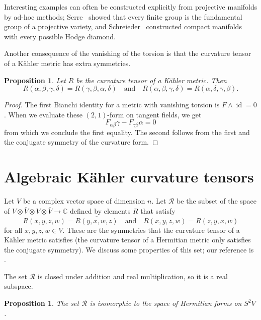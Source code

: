 \documentclass[11pt]{article}
\newtheorem{prop}[theo]{Proposition}
\newtheorem*{proof}{Proof}
\newcommand{\kk}[1]{\mathbb{#1}}
\newcommand{\cc}[1]{\mathcal{#1}}
\DeclareMathOperator{\id}{id}
\begin{document}
Interesting examples can often be constructed explicitly from projective manifolds by ad-hoc methods; Serre~\cite{serre1958topologie} showed that every finite group is the fundamental group of a projective variety, and Schreieder~\cite{schreieder2015construction} constructed compact manifolds with every possible Hodge diamond.


Another consequence of the vanishing of the torsion is that the curvature tensor of a K\"ahler metric has extra symmetries.

\begin{prop}
Let $R$ be the curvature tensor of a K\"ahler metric. Then
$$
R(\alpha,\beta,\gamma,\delta) = R(\gamma,\beta,\alpha,\delta)
\quad\text{and}\quad
R(\alpha,\beta,\gamma,\delta) = R(\alpha,\delta,\gamma,\beta).
$$
\end{prop}

\begin{proof}
The first Bianchi identity for a metric with vanishing torsion is $F \wedge \id = 0$. When we evaluate these $(2,1)$-form on tangent fields, we get
$$
F_{\alpha\beta}\gamma - F_{\gamma\beta}\alpha = 0
$$
from which we conclude the first equality. The second follows from the first and the conjugate symmetry of the curvature form.
\end{proof}




\section{Algebraic K\"ahler curvature tensors}
\label{sec:algebraic-curvature-tensors}

Let $V$ be a complex vector space of dimension $n$. Let $\cc R$ be the subset of the space of $V \otimes \overline V \otimes V \otimes \overline V \to \kk C$ defined by elements $R$ that satisfy
$$
R(x, y, z, w) = \overline{R(y, x, w, z)}
\quad\text{and}\quad
R(x, y, z, w) = R(z, y, x, w)
$$
for all $x,y,z,w \in V$. These are the symmetries that the curvature tensor of a K\"ahler metric satisfies (the curvature tensor of a Hermitian metric only satisfies the conjugate symmetry). We discuss some properties of this set; our reference is \cite{algebraic-kahler-curvature}.

The set $\cc R$ is closed under addition and real multiplication, so it is a real subspace.


\begin{prop}
The set $\cc R$ is isomorphic to the space of Hermitian forms on $S^2 V$.
\end{prop}
\end{document}
